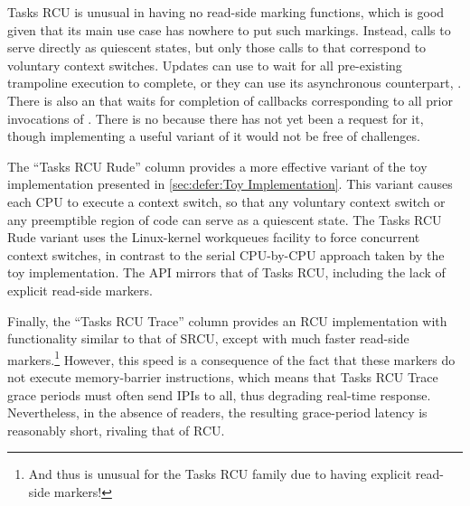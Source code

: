 Tasks RCU is unusual in having no read-side marking functions, which
is good given that its main use case has nowhere to put such markings.
Instead, calls to  serve directly as quiescent states,
but only those calls to  that correspond to voluntary
context switches.
Updates can use  to wait for all pre-existing
trampoline execution to complete, or they can use its asynchronous
counterpart, .
There is also an  that waits for completion
of callbacks corresponding to all prior invocations of .
There is no  because there has
not yet been a request for it, though implementing a useful variant of
it would not be free of challenges.

\QuickQuizEnd

The ``Tasks RCU Rude'' column provides a more effective variant
of the toy implementation presented in
\cref{sec:defer:Toy Implementation}.
This variant causes each CPU to execute a context switch,
so that any voluntary context switch or any preemptible region of
code can serve as a quiescent state.
The Tasks RCU Rude variant uses the Linux-kernel workqueues facility to
force concurrent context switches, in contrast to the serial
CPU-by-CPU approach taken by the toy implementation.
The API mirrors that of Tasks RCU, including the lack of explicit
read-side markers.

Finally, the ``Tasks RCU Trace'' column provides an RCU implementation
with functionality similar to that of SRCU, except with much faster
read-side markers.\footnote{
	And thus is unusual for the Tasks RCU family due to having
	explicit read-side markers!}
However, this speed is a consequence of the fact that these markers
do not execute memory-barrier instructions, which means that Tasks
RCU Trace grace periods must often send IPIs to all, thus degrading
real-time response.
Nevertheless, in the absence of readers, the resulting grace-period
latency is reasonably short, rivaling that of RCU\@.

